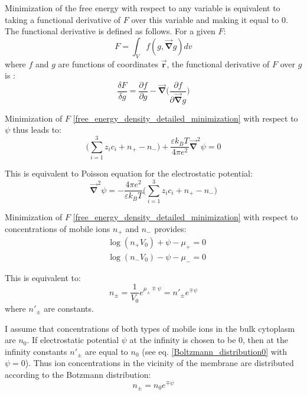 Minimization of the free energy with respect to any variable is equivalent to taking a functional derivative of $F$ over this variable and making it equal to 0. The functional derivative is defined as follows. For a given $F$:
\begin{equation}
 F = \int_V f(g, \vec{\mathbf{\nabla}} g) dv
\end{equation}
where $f$ and $g$ are functions of coordinates $\vec{\mathbf{r}}$, the functional derivative of $F$ over $g$ is \cite{Parr1994}:
\begin{equation}
 \frac{\delta F}{\delta g} = \frac{\partial f}{\partial g} - \vec{\mathbf{\nabla}} \Big(\frac{\partial f}{\partial \vec{\mathbf{\nabla}} g}\Big)
\end{equation}

Minimization of $F$ \eqref{free_energy_density_detailed_minimization} with respect to $\psi$ thus leads to:
\begin{equation}
 \Big(\sum_{i=1}^3 z_i c_i + n_+ - n_-\Big) + \frac{\varepsilon k_BT}{4\pi e^2}\vec{\mathbf{\nabla}}^2 \psi = 0
\end{equation}

This is equivalent to Poisson equation for the electrostatic potential:
\begin{equation}
 \label{poisson0}\vec{\mathbf{\nabla}}^2 \psi = -\frac{4\pi e^2}{\varepsilon k_BT}\Big(\sum_{i=1}^3 z_i c_i + n_+ - n_-\Big)
\end{equation}

Minimization of $F$ \eqref{free_energy_density_detailed_minimization} with respect to concentrations of mobile ions $n_+$ and $n_-$ provides:
\begin{align}
 \label{F_minimized_by_n}&\log{(n_+ V_0)} + \psi - \mu_+=0 \nonumber \\
 &\log{(n_- V_0)} - \psi - \mu_-=0
\end{align}

This is equivalent to:
\begin{equation}
 \label{Boltzmann_distribution0}n_{\pm}=\frac{1}{V_0}e^{\mu_{\pm}\mp\psi}=n'_{\pm}e^{\mp\psi}
\end{equation}
where $n'_{\pm}$ are constants.

I assume that concentrations of both types of mobile ions in the bulk cytoplasm are $n_0$. If electrostatic potential $\psi$ at the infinity is chosen to be 0, then at the infinity constants $n'_{\pm}$ are equal to $n_0$ (see eq. \eqref{Boltzmann_distribution0} with $\psi = 0$). Thus ion concentrations in the vicinity of the membrane are distributed according to the Botzmann distribution:
\begin{equation}
 \label{Boltzmann_distribution}
 n_{\pm}=n_0e^{\mp\psi}
\end{equation}


